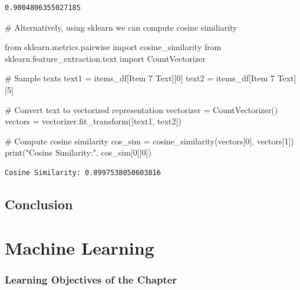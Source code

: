 \documentclass[
  letterpaper,
  DIV=11,
  numbers=noendperiod]{scrreprt}
\newenvironment{Shaded}{\begin{snugshade}}{\end{snugshade}}
\newcommand{\BuiltInTok}[1]{\textcolor[rgb]{0.00,0.23,0.31}{#1}}
\newcommand{\CommentTok}[1]{\textcolor[rgb]{0.37,0.37,0.37}{#1}}
\newcommand{\DecValTok}[1]{\textcolor[rgb]{0.68,0.00,0.00}{#1}}
\newcommand{\ImportTok}[1]{\textcolor[rgb]{0.00,0.46,0.62}{#1}}
\newcommand{\NormalTok}[1]{\textcolor[rgb]{0.00,0.23,0.31}{#1}}
\newcommand{\OperatorTok}[1]{\textcolor[rgb]{0.37,0.37,0.37}{#1}}
\newcommand{\StringTok}[1]{\textcolor[rgb]{0.13,0.47,0.30}{#1}}
\begin{document}
\begin{verbatim}
0.9004806355027185
\end{verbatim}

\begin{Shaded}
\begin{Highlighting}[]
\CommentTok{\# Alternatively, using sklearn we can compute cosine similiarity}

\ImportTok{from}\NormalTok{ sklearn.metrics.pairwise }\ImportTok{import}\NormalTok{ cosine\_similarity}
\ImportTok{from}\NormalTok{ sklearn.feature\_extraction.text }\ImportTok{import}\NormalTok{ CountVectorizer}

\CommentTok{\# Sample texts}
\NormalTok{text1 }\OperatorTok{=}\NormalTok{ items\_df[}\StringTok{\textquotesingle{}Item 7 Text\textquotesingle{}}\NormalTok{][}\DecValTok{0}\NormalTok{]}
\NormalTok{text2 }\OperatorTok{=}\NormalTok{ items\_df[}\StringTok{\textquotesingle{}Item 7 Text\textquotesingle{}}\NormalTok{][}\DecValTok{5}\NormalTok{]}

\CommentTok{\# Convert text to vectorized representation}
\NormalTok{vectorizer }\OperatorTok{=}\NormalTok{ CountVectorizer()}
\NormalTok{vectors }\OperatorTok{=}\NormalTok{ vectorizer.fit\_transform([text1, text2])}

\CommentTok{\# Compute cosine similarity}
\NormalTok{cos\_sim }\OperatorTok{=}\NormalTok{ cosine\_similarity(vectors[}\DecValTok{0}\NormalTok{], vectors[}\DecValTok{1}\NormalTok{])}
\BuiltInTok{print}\NormalTok{(}\StringTok{"Cosine Similarity:"}\NormalTok{, cos\_sim[}\DecValTok{0}\NormalTok{][}\DecValTok{0}\NormalTok{])}
\end{Highlighting}
\end{Shaded}

\begin{verbatim}
Cosine Similarity: 0.8997538050603816
\end{verbatim}

\section{Conclusion}\label{conclusion-3}

\chapter{Machine Learning}\label{machine-learning}

\subsection*{Learning Objectives of the
Chapter}\label{learning-objectives-of-the-chapter-10}
\end{document}
